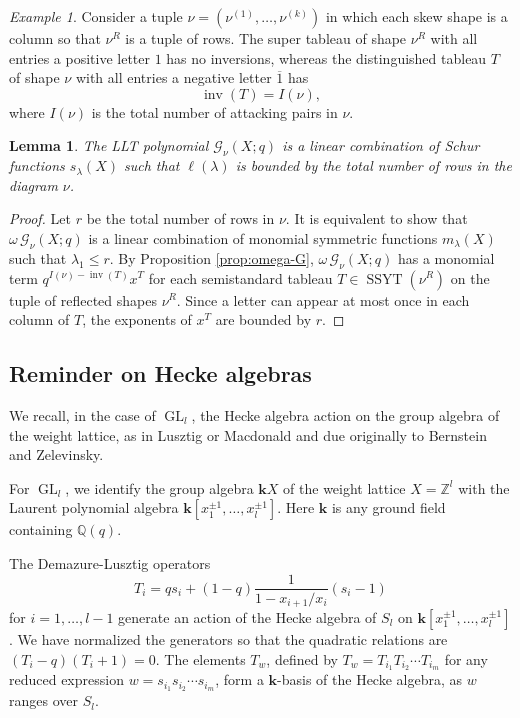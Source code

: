 \documentclass[12pt]{amsart}
\newtheorem{lemma}[thm]{Lemma}
\theoremstyle{definition}
\theoremstyle{remark}
\newtheorem{example}[thm]{Example}
\newcommand{\QQ}{{\mathbb Q}}
\newcommand{\ZZ}{{\mathbb Z}}
\newcommand{\kk}{{\mathbf k}}
\newcommand{\Gcal}{{\mathcal G}}
\DeclareMathOperator{\inv}{inv}
\DeclareMathOperator{\GL}{GL}
\DeclareMathOperator{\SSYT}{SSYT}
\begin{document}
\begin{example}
Consider a tuple $\nu = (\nu ^{(1)},\ldots,\nu ^{(k)})$ in which each
skew shape is a column so that $\nu^R$ is a tuple of rows.  The super
tableau of shape $\nu^R$ with all entries a positive letter $1$ has no
inversions, whereas the distinguished tableau $T$ of shape $\nu$ with
all entries a negative letter $\overline{1}$ has
\begin{equation} \label{e:inv2Tnot}
\inv(T)=I(\nu),
\end{equation}
where $I(\nu)$ is the total number of attacking pairs in $\nu$.
\end{example}

\begin{lemma}\label{lem:finite-variables}
The LLT polynomial $\Gcal_{\nu }(X;q)$ is a linear combination of Schur
functions $s_{\lambda }(X)$ such that $\ell(\lambda )$ is bounded by the
total number of rows in the diagram $\nu$.
\end{lemma}

\begin{proof} Let $r$ be the total number of rows in $\nu $.  It is
equivalent to show that $\omega \, \Gcal_{\nu }(X;q)$ is a linear
combination of monomial symmetric functions $m_{\lambda }(X)$ such
that $\lambda _{1}\leq r$.  By Proposition \ref{prop:omega-G}, $\omega
\, \Gcal_{\nu }(X;q)$ has a monomial term $q^{I(\nu )-\inv (T)} x^{T}$ for
each semistandard tableau $T\in \SSYT(\nu ^{R})$ on the tuple of
reflected shapes $\nu ^{R}$.  Since a letter can appear at most once
in each column of $T$, the exponents of $x^{T}$ are bounded by $r$.
\end{proof}

\subsection{Reminder on Hecke algebras} \label{ss:Hecke}

We recall, in the case of $\GL _{l}$, the Hecke algebra action on the
group algebra of the weight lattice, as in Lusztig \cite{Lusztig89} or
Macdonald \cite{Macdonald03} and due originally to Bernstein and
Zelevinsky.

For $\GL _{l}$, we identify the group algebra $\kk X$ of the weight
lattice $X = \ZZ ^{l}$ with the Laurent polynomial algebra $\kk
[x_{1}^{\pm 1},\ldots,x_{l}^{\pm 1}]$.  Here $\kk $ is any ground
field containing $\QQ (q)$.

The Demazure-Lusztig operators
\begin{equation}\label{e:Demazure-Lusztig}
T_{i} = q s_{i} + (1-q)\frac{1}{1-x_{i+1}/x_{i}} (s_{i}-1)
\end{equation}
for $i = 1,\ldots,l-1$ generate an action of the Hecke algebra 
of $S_{l}$ on $\kk [x_{1}^{\pm 1},\ldots,x_{l}^{\pm 1}]$.
We have normalized the generators so that the quadratic
relations are $(T_{i}-q)(T_{i}+1)=0$.  The elements $T_w$, defined by
$T_w = T_{i_1} T_{i_2}\cdots T_{i_m}$ for any reduced expression
$w=s_{i_1}s_{i_2}\cdots s_{i_m}$, form a $\kk$-basis of the Hecke
algebra, as $w$ ranges over $S_l$.
\end{document}
